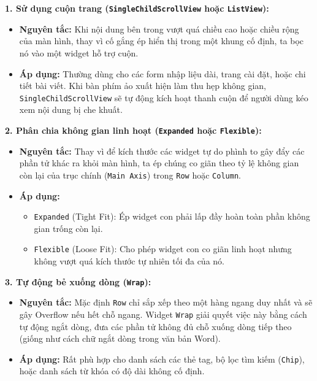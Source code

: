 \documentclass[aspectratio=169, 10pt]{beamer}
\newcommand{\SlideHeader}[2]{%
  \noindent{\textcolor{AccentOrange}{\textbf{\footnotesize #1}}}\\[0.08cm]
  \noindent{\Large \textbf{\textcolor{NavyTitle}{#2}}}\\[0.22cm]
}
\begin{document}
\begin{frame}
  \SlideHeader{CƠ SỞ LÝ THUYẾT}{Chi Tiết Các Cách Xử Lý Overflow (Phần 1)}

  \textbf{1. Sử dụng cuộn trang (\texttt{SingleChildScrollView} hoặc \texttt{ListView}):}
  \begin{itemize}
    \item \textbf{Nguyên tắc:} Khi nội dung bên trong vượt quá chiều cao hoặc chiều rộng của màn hình, thay vì cố gắng ép hiển thị trong một khung cố định, ta bọc nó vào một widget hỗ trợ cuộn.
    \item \textbf{Áp dụng:} Thường dùng cho các form nhập liệu dài, trang cài đặt, hoặc chi tiết bài viết. Khi bàn phím ảo xuất hiện làm thu hẹp không gian, \texttt{SingleChildScrollView} sẽ tự động kích hoạt thanh cuộn để người dùng kéo xem nội dung bị che khuất.
  \end{itemize}

  \vspace{0.25cm}
  \textbf{2. Phân chia không gian linh hoạt (\texttt{Expanded} hoặc \texttt{Flexible}):}
  \begin{itemize}
    \item \textbf{Nguyên tắc:} Thay vì để kích thước các widget tự do phình to gây đẩy các phần tử khác ra khỏi màn hình, ta ép chúng co giãn theo tỷ lệ không gian còn lại của trục chính (\texttt{Main Axis}) trong \texttt{Row} hoặc \texttt{Column}.
    \item \textbf{Áp dụng:}
      \begin{itemize}
        \item \texttt{Expanded} (Tight Fit): Ép widget con phải lấp đầy hoàn toàn phần không gian trống còn lại.
        \item \texttt{Flexible} (Loose Fit): Cho phép widget con co giãn linh hoạt nhưng không vượt quá kích thước tự nhiên tối đa của nó.
      \end{itemize}
  \end{itemize}

  \vspace{0.25cm}
  \textbf{3. Tự động bẻ xuống dòng (\texttt{Wrap}):}
  \begin{itemize}
    \item \textbf{Nguyên tắc:} Mặc định \texttt{Row} chỉ sắp xếp theo một hàng ngang duy nhất và sẽ gây Overflow nếu hết chỗ ngang. Widget \texttt{Wrap} giải quyết việc này bằng cách tự động ngắt dòng, đưa các phần tử không đủ chỗ xuống dòng tiếp theo (giống như cách chữ ngắt dòng trong văn bản Word).
    \item \textbf{Áp dụng:} Rất phù hợp cho danh sách các thẻ tag, bộ lọc tìm kiếm (\texttt{Chip}), hoặc danh sách từ khóa có độ dài không cố định.
  \end{itemize}
\end{frame}
\end{document}
